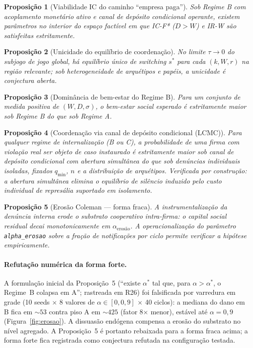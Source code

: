\documentclass[12pt,a4paper]{article}
\newtheorem{proposition}{Proposição}
\begin{document}
\begin{proposition}[Viabilidade IC do caminho ``empresa paga'']
Sob Regime B com acoplamento monetário ativo e canal de depósito condicional
operante, existem parâmetros no interior do espaço factível em que IC-F* ($D > W$)
e IR-W são satisfeitas estritamente.
\end{proposition}

\begin{proposition}[Unicidade do equilíbrio de coordenação]
No limite $\tau \to 0$ do subjogo de jogo global, há equilíbrio único de
\textit{switching} $s^*$ para cada $(k, W, r)$ na região relevante; sob
heterogeneidade de arquétipos e papéis, a unicidade é conjectura aberta.
\end{proposition}

\begin{proposition}[Dominância de bem-estar do Regime B]
Para um conjunto de medida positiva de $(W, D, \sigma)$, o bem-estar social
esperado é estritamente maior sob Regime B do que sob Regime A.
\end{proposition}

\begin{proposition}[Coordenação via canal de depósito condicional (LCMC)]
Para qualquer regime de internalização (B ou C), a probabilidade de uma firma com
violação real ser objeto de caso instaurado é estritamente maior sob canal de
depósito condicional com abertura simultânea do que sob denúncias individuais
isoladas, fixados $q_{\min}$, $n$ e a distribuição de arquétipos. Verificada por
construção: a abertura simultânea elimina o equilíbrio de silêncio induzido pelo
custo individual de represália suportado em isolamento.
\end{proposition}

\begin{proposition}[Erosão Coleman --- forma fraca]
A instrumentalização da denúncia interna erode o substrato cooperativo
intra-firma: o capital social residual decai monotonicamente em
$\alpha_{\text{erosão}}$. A operacionalização do parâmetro
\texttt{alpha\_erosao} sobre a fração de notificações por ciclo
\citep{coleman1990foundations, ostrom1990governing} permite verificar
a hipótese empiricamente.
\end{proposition}

\paragraph{Refutação numérica da forma forte.} A formulação inicial da
Proposição~5 (``existe $\alpha^*$ tal que, para $\alpha > \alpha^*$, o
Regime~B colapsa em A''; rastreada em R26) foi falsificada por varredura
em grade (10 seeds $\times$ 8 valores de $\alpha \in [0, 0{,}9]$ $\times$
40 ciclos): a mediana do dano em B fica em $\sim 53$ contra piso A em
$\sim 425$ (fator 8$\times$ menor), estável até $\alpha = 0{,}9$
(Figura~\ref{fig:erosao}). A dissuasão endógena compensa a erosão
do substrato no nível agregado. A Proposição~5 é portanto rebaixada para
a forma fraca acima; a forma forte fica registrada como conjectura
refutada na configuração testada.
\end{document}
